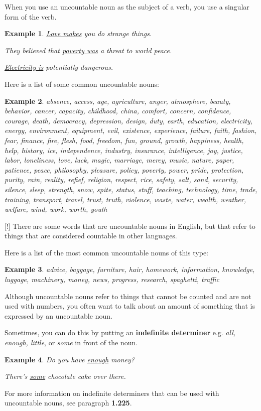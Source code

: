 \documentclass[oneside]{book}
\numberwithin{equation}{section}
\newtheorem{example}{Example}[section]
\begin{document}
%
\noindent{} When you use an uncountable noun as the subject of a verb, you use a singular form of the verb.
\begin{example}
    \underline{Love makes} you do strange things.
    
    They believed that \underline{poverty was} a threat to world peace.
    
    \underline{Electricity is} potentially dangerous.
\end{example}
%
\noindent{} Here is a list of some common uncountable nouns:
\begin{example}
    absence, access, age, agriculture, anger, atmosphere, beauty, behavior, cancer, capacity, childhood, china, comfort, concern, confidence, courage, death, democracy, depression, design, duty, earth, education, electricity, energy, environment, equipment, evil, existence, experience, failure, faith, fashion, fear, finance, fire, flesh, food, freedom, fun, ground, growth, happiness, health, help, history, ice, independence, industry, insurance, intelligence, joy, justice, labor, loneliness, love, luck, magic, marriage, mercy, music, nature, paper, patience, peace, philosophy, pleasure, policy, poverty, power, pride, protection, purity, rain, reality, refief, religion, respect, rice, safety, salt, sand, security, silence, sleep, strength, snow, spite, status, stuff, teaching, technology, time, trade, training, transport, travel, trust, truth, violence, waste, water, wealth, weather, welfare, wind, work, worth, youth
\end{example}
%
\noindent{} [!] There are some words that are uncountable nouns in English, but that refer to things that are considered countable in other languages.

%
Here is a list of the most common uncountable nouns of this type:
\begin{example}
    advice, baggage, furniture, hair, homework, information, knowledge, luggage, machinery, money, news, progress, research, spaghetti, traffic
\end{example}
%
\noindent{} Although uncountable nouns refer to things that cannot be counted and are not used with numbers, you often want to talk about an amount of something that is expressed by an uncountable noun.

%
Sometimes, you can do this by putting an \textbf{indefinite determiner} e.g. \textit{all, enough, little}, or \textit{some} in front of the noun.
\begin{example}
    Do you have \underline{enough} money?
    
    There's \underline{some} chocolate cake over there.
\end{example}
For more information on indefinite determiners that can be used with uncountable nouns, see paragraph \textbf{1.225}.
\end{document}
